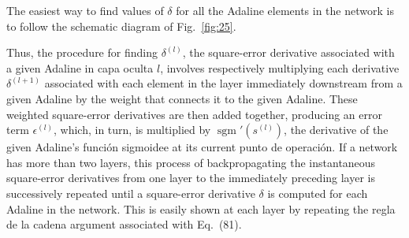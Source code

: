 \documentclass[10pt,twocolumn]{article}
\newcommand{\sgm}{\operatorname{sgm}}
\begin{document}
The easiest way to find values of $\delta$ for all the Adaline elements in the
network is to follow the schematic diagram of Fig.~\ref{fig:25}.

Thus, the procedure for finding $\delta^{(l)}$, the square-error derivative
associated with a given Adaline in capa oculta $l$, involves respectively
multiplying each derivative $\delta^{(l+1)}$ associated with each element in the
layer immediately downstream from a given Adaline by the weight that connects it to
the given Adaline. These weighted square-error derivatives are then added together,
producing an error term $\epsilon^{(l)}$, which, in turn, is multiplied by
$\sgm'(s^{(l)})$, the derivative of the given Adaline's función sigmoidee at its
current punto de operación. If a network has more than two layers, this process of
backpropagating the instantaneous square-error derivatives from one layer to the
immediately preceding layer is successively repeated until a square-error
derivative $\delta$ is computed for each Adaline in the network. This is easily
shown at each layer by repeating the regla de la cadena argument associated with Eq.~(81).
\end{document}

